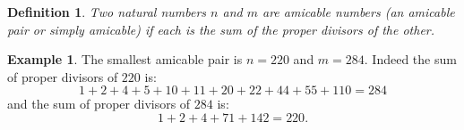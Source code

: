 \documentclass[12pt]{article}
\newtheorem*{defn}{Definition}
\theoremstyle{definition}
\newtheorem*{exa}{Example}
\begin{document}
\begin{defn}
Two natural numbers $n$ and $m$ are amicable numbers (an amicable pair or simply amicable) if each is the sum of the proper divisors of the other.
\end{defn}

\begin{exa}
The smallest amicable pair is $n=220$ and $m=284$. Indeed the sum of proper divisors of $220$ is:
$$1+2+4+5+10+11+20+22+44+55+110=284$$
and the sum of proper divisors of $284$ is:
$$1+2+4+71+142=220.$$ 
\end{exa}
\end{document}
